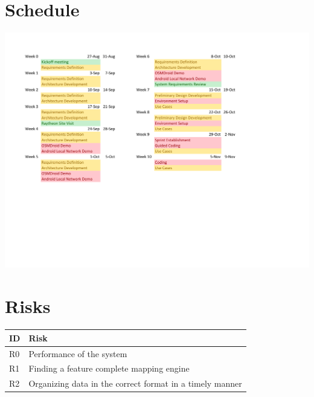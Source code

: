 \documentclass{article}
\begin{document}
\section{Schedule}
\includegraphics[keepaspectratio, width=8in]{FallSchedule.pdf} \\
\section{Risks}

\begin{tabular}{ | p{.5in} | p{4.5in} | }
\hline
\textbf{ID} & \textbf{Risk}\\
\hline
\hline
R0 & Performance of the system\\
\hline
R1 & Finding a feature complete mapping engine\\
\hline
R2 & Organizing data in the correct format in a timely manner\\
\hline
\end{tabular}
\end{document}
